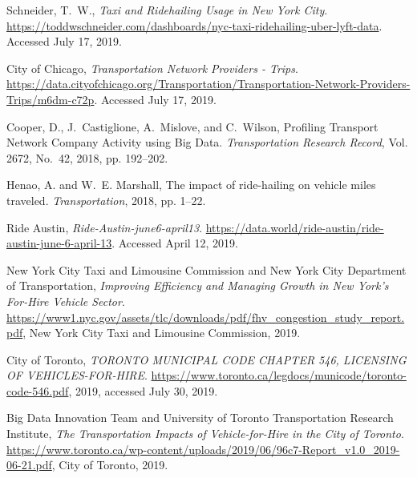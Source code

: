 \documentclass[]{trbunofficial_bdit_final}
\begin{document}
\begin{thebibliography}{33}
\raggedright
\providecommand{\natexlab}[1]{#1}

Schneider, T.~W., \emph{Taxi and Ridehailing Usage in New York City}.
  \url{https://toddwschneider.com/dashboards/nyc-taxi-ridehailing-uber-lyft-data}.
  Accessed July 17, 2019.

{City of Chicago}, \emph{Transportation Network Providers - Trips}.
  \url{https://data.cityofchicago.org/Transportation/Transportation-Network-Providers-Trips/m6dm-c72p}.
  Accessed July 17, 2019.

Cooper, D., J.~Castiglione, A.~Mislove, and C.~Wilson, Profiling Transport
  Network Company Activity using Big Data. \emph{Transportation Research
  Record}, Vol. 2672, No.~42, 2018, pp. 192--202.

Henao, A. and W.~E. Marshall, The impact of ride-hailing on vehicle miles
  traveled. \emph{Transportation}, 2018, pp. 1--22.

{Ride Austin}, \emph{Ride-Austin-june6-april13}.
  \url{https://data.world/ride-austin/ride-austin-june-6-april-13}. Accessed
  April 12, 2019.

{New York City Taxi and Limousine Commission} and {New York City Department of
  Transportation}, \emph{Improving Efficiency and Managing Growth in New York's
  For-Hire Vehicle Sector}.
  \url{https://www1.nyc.gov/assets/tlc/downloads/pdf/fhv_congestion_study_report.pdf},
  New York City Taxi and Limousine Commission, 2019.

{City of Toronto}, \emph{TORONTO MUNICIPAL CODE CHAPTER 546, LICENSING OF
  VEHICLES-FOR-HIRE}.
  \url{https://www.toronto.ca/legdocs/municode/toronto-code-546.pdf}, 2019,
  accessed July 30, 2019.

{Big Data Innovation Team} and {University of Toronto Transportation Research
  Institute}, \emph{The Transportation Impacts of Vehicle-for-Hire in the City
  of Toronto}.
  \url{https://www.toronto.ca/wp-content/uploads/2019/06/96c7-Report_v1.0_2019-06-21.pdf},
  City of Toronto, 2019.


\end{thebibliography}
\end{document}
